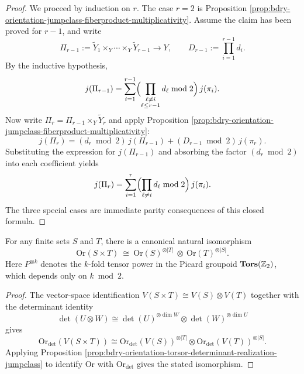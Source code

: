 \begin{proof}
We proceed by induction on \(r\).
The case \(r=2\) is Proposition \ref{prop:bdry-orientation-jumpclass-fiberproduct-multiplicativity}.
Assume the claim has been proved for \(r-1\), and write
\[
\Pi_{r-1}:=\widetilde Y_1\times_Y\cdots\times_Y\widetilde Y_{r-1}\to Y,
\qquad
D_{r-1}:=\prod_{i=1}^{r-1}d_i.
\]
By the inductive hypothesis,
\[
j(\Pi_{r-1})
=
\sum_{i=1}^{r-1}\Bigl(\prod_{\substack{\ell\neq i\\ \ell\le r-1}} d_\ell \bmod 2\Bigr)\,j(\pi_i).
\]
Now write
\(
\Pi_r=\Pi_{r-1}\times_Y\widetilde Y_r
\)
and apply Proposition \ref{prop:bdry-orientation-jumpclass-fiberproduct-multiplicativity}:
\[
j(\Pi_r)
=(d_r\bmod 2)\,j(\Pi_{r-1})+(D_{r-1}\bmod 2)\,j(\pi_r).
\]
Substituting the expression for \(j(\Pi_{r-1})\) and absorbing the factor \((d_r\bmod 2)\) into each coefficient yields
\[
j(\Pi_r)
=
\sum_{i=1}^r\Bigl(\prod_{\ell\neq i} d_\ell \bmod 2\Bigr)\,j(\pi_i).
\]
The three special cases are immediate parity consequences of this closed formula. \qedhere
\end{proof}

\begin{proposition}\label{prop:bdry-orientation-cartesian-product-exponent-law}
For any finite sets \(S\) and \(T\), there is a canonical natural isomorphism
\[
\mathrm{Or}(S\times T)\ \cong\ \mathrm{Or}(S)^{\otimes |T|}\ \otimes\ \mathrm{Or}(T)^{\otimes |S|}.
\]
Here \(P^{\otimes k}\) denotes the \(k\)-fold tensor power in the Picard groupoid \(\mathbf{Tors}(\mathbb{Z}_2)\), which depends only on \(k\bmod 2\).
\end{proposition}

\begin{proof}
The vector-space identification \(V(S\times T)\cong V(S)\otimes V(T)\) together with the determinant identity
\[
\det(U\otimes W)\cong \det(U)^{\otimes \dim W}\otimes \det(W)^{\otimes \dim U}
\]
gives
\[
\mathrm{Or}_{\det}(V(S\times T))
\cong
\mathrm{Or}_{\det}(V(S))^{\otimes |T|}\otimes \mathrm{Or}_{\det}(V(T))^{\otimes |S|}.
\]
Applying Proposition \ref{prop:bdry-orientation-torsor-determinant-realization-jumpclass} to identify \(\mathrm{Or}\) with \(\mathrm{Or}_{\det}\) gives the stated isomorphism. \qedhere
\end{proof}

